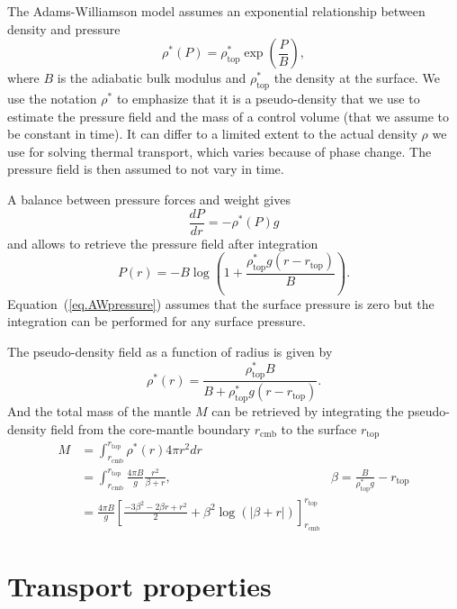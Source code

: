 \documentclass{article}
\begin{document}
The Adams-Williamson model assumes an exponential relationship between density and pressure
\begin{equation}
    \rho^*(P) = \rho^*_\mathrm{top} \exp\left( \frac{P}{B}\right),
\end{equation}
where $B$ is the adiabatic bulk modulus and $\rho_\mathrm{top}^*$ the density at the surface. We use the notation $\rho^*$ to emphasize that it is a pseudo-density that we use to estimate the pressure field and the mass of a control volume (that we assume to be constant in time). It can differ to a limited extent to the actual density $\rho$ we use for solving thermal transport, which varies because of phase change. The pressure field is then assumed to not vary in time.

A balance between pressure forces and weight gives
\begin{equation}
    \frac{dP}{dr} = -\rho^*(P) g
\end{equation}
and allows to retrieve the pressure field after integration
\begin{equation}
    P(r) = -B \log\left(1+\frac{\rho^*_\mathrm{top} g(r-r_\mathrm{top})}{B} \right).
    \label{eq.AWpressure}
\end{equation}
Equation~(\ref{eq.AWpressure}) assumes that the surface pressure is zero but the integration can be performed for any surface pressure.

The pseudo-density field as a function of radius is given by
\begin{equation}
    \rho^*(r) = \frac{\rho_\mathrm{top}^* B}{B+ \rho_\mathrm{top}^*g(r-r_\mathrm{top})}.
\end{equation}
And the total mass of the mantle $M$ can be retrieved by integrating the pseudo-density field from the core-mantle boundary $r_\mathrm{cmb}$ to the surface $r_\mathrm{top}$
\begin{align}
    M &= \int^{r_\mathrm{top}}_{r_\mathrm{cmb}} \rho^*(r) 4\pi r^2 dr\\
      &= \int^{r_\mathrm{top}}_{r_\mathrm{cmb}} \frac{4\pi B}{g}\frac{r^2}{\beta+r}, & \beta=\frac{B}{\rho^*_\mathrm{top}g}-r_\mathrm{top}\\
      &= \frac{4\pi B}{g} \left[ \frac{-3\beta^2 - 2\beta r +r^2}{2}+\beta^2\log(\left| \beta+r\right|) \right]^{r_\mathrm{top}}_{r_\mathrm{cmb}}
\end{align}



\section{Transport properties}
\end{document}
